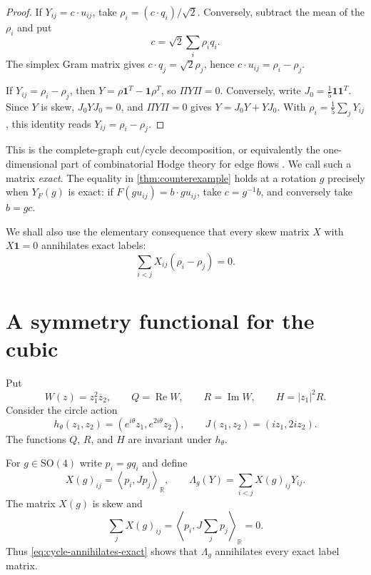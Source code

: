 \documentclass[11pt,reqno]{amsart}
\theoremstyle{remark}
\newcommand{\R}{\mathbb R}
\newcommand{\one}{\mathbf 1}
\newcommand{\SO}{\mathrm{SO}}
\newcommand{\ip}[2]{\left\langle #1,#2\right\rangle}
\newcommand{\abs}[1]{\left\lvert #1\right\rvert}
\begin{document}
\begin{proof}
If $Y_{ij}=c\cdot u_{ij}$, take
$\rho_i=(c\cdot q_i)/\sqrt2$.  Conversely, subtract the mean of the
$\rho_i$ and put
\[
 c=\sqrt2\sum_i\rho_iq_i.
\]
The simplex Gram matrix gives $c\cdot q_j=\sqrt2\rho_j$, hence
$c\cdot u_{ij}=\rho_i-\rho_j$.

If $Y_{ij}=\rho_i-\rho_j$, then
$Y=\rho\one^T-\one\rho^T$, so $\Pi Y\Pi=0$.  Conversely, write
$J_0=\frac15\one\one^T$.  Since $Y$ is skew, $J_0YJ_0=0$, and
$\Pi Y\Pi=0$ gives $Y=J_0Y+YJ_0$.  With
$\rho_i=\frac15\sum_jY_{ij}$, this identity reads
$Y_{ij}=\rho_i-\rho_j$.
\end{proof}

This is the complete-graph cut/cycle decomposition, or equivalently the
one-dimensional part of combinatorial Hodge theory for edge flows
\cite{JiangLimYaoYe2011}.  We call such a matrix \emph{exact}.  The equality
in \cref{thm:counterexample} holds at a rotation $g$ precisely when
$Y_F(g)$ is exact: if $F(gu_{ij})=b\cdot gu_{ij}$, take $c=g^{-1}b$, and
conversely take $b=gc$.

We shall also use the elementary consequence that every skew matrix $X$ with
$X\one=0$ annihilates exact labels:
\begin{equation}\label{eq:cycle-annihilates-exact}
 \sum_{i<j}X_{ij}(\rho_i-\rho_j)=0.
\end{equation}

\section{A symmetry functional for the cubic}\label{sec:symmetry}

Put
\begin{equation}\label{eq:WQRH}
 W(z)=z_1^2\overline z_2,
 \qquad Q=\operatorname{Re}W,
 \qquad R=\operatorname{Im}W,
 \qquad H=\abs{z_1}^2R.
\end{equation}
Consider the circle action
\begin{equation}\label{eq:circle-action}
 h_\theta(z_1,z_2)=(e^{i\theta}z_1,e^{2i\theta}z_2),
 \qquad
 J(z_1,z_2)=(iz_1,2iz_2).
\end{equation}
The functions $Q$, $R$, and $H$ are invariant under $h_\theta$.

For $g\in\SO(4)$ write $p_i=gq_i$ and define
\begin{equation}\label{eq:X-Lambda}
 X(g)_{ij}=\ip{p_i}{Jp_j}_{\R},
 \qquad
 \Lambda_g(Y)=\sum_{i<j}X(g)_{ij}Y_{ij}.
\end{equation}
The matrix $X(g)$ is skew and
\[
 \sum_jX(g)_{ij}
 =\ip{p_i}{J\sum_jp_j}_{\R}=0.
\]
Thus \eqref{eq:cycle-annihilates-exact} shows that $\Lambda_g$ annihilates
every exact label matrix.
\end{document}

